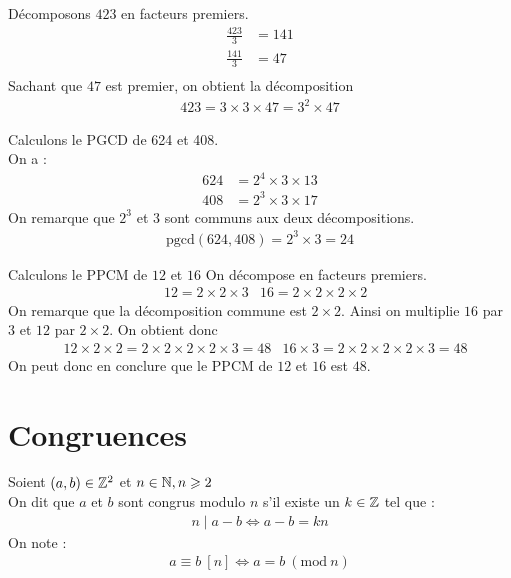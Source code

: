 \begin{exemple}
Décomposons $423$ en facteurs premiers.
\begin{align*}
\frac{423}{3} &= 141 \\
\frac{141}{3} &= 47 \\
\end{align*}
Sachant que $47$ est premier, on obtient la décomposition
\begin{align*}
423 = 3 \times 3 \times 47 = 3^2 \times 47
\end{align*}
\end{exemple}

\begin{exemple}
Calculons le PGCD de 624 et 408.\\
On a :
\begin{align*}
624 &= 2^4 \times 3 \times 13 \\
408 &= 2^3 \times 3 \times 17
\end{align*}
On remarque que $2^3$ et $3$ sont communs aux deux décompositions.
\begin{align*}
\mathrm{pgcd}(624, 408) = 2^3 \times 3 = 24
\end{align*}
\end{exemple}

\begin{exemple}
Calculons le PPCM de $12$ et $16$
On décompose en facteurs premiers. 
\begin{align*}
&12 = 2 \times 2 \times 3
&16 = 2 \times 2 \times 2 \times 2
\end{align*}
On remarque que la décomposition commune est $2 \times 2$.
Ainsi on multiplie $16$ par $3$ et $12$ par $2 \times 2$.
On obtient donc 
\begin{align*}
&12 \times 2 \times 2 = 2 \times 2 \times 2 \times 2 \times 3 = 48
&16 \times 3 = 2 \times 2 \times 2 \times 2 \times 3 = 48
\end{align*}
On peut donc en conclure que le PPCM de $12$ et $16$ est $48$.
\end{exemple}

\section{Congruences}
\begin{graybox}
\begin{definition}[Congruence]
	Soient $(a, b) \in \mathbb{Z}^2$ et $n \in \mathbb{N}, n \geqslant 2$ \\
	On dit que $a$ et $b$ sont congrus modulo $n$ s'il existe un $k \in \mathbb{Z}$ tel que :
	\begin{align*}
	n \mid a - b \iff a - b = kn
	\end{align*}
	On note : 
	\begin{align*}
	a \equiv b \ [n] \iff a = b \ (\mathrm{mod}\ n)
	\end{align*}
\end{definition}
\end{graybox}

